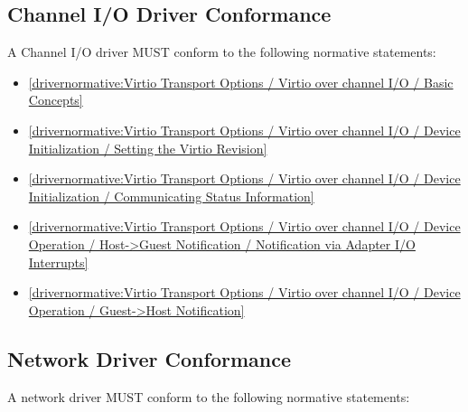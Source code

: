 \subsection{Channel I/O Driver Conformance}\label{sec:Conformance / Driver Conformance / Channel I/O Driver Conformance}

A Channel I/O driver MUST conform to the following normative statements:

\begin{itemize}
\item \ref{drivernormative:Virtio Transport Options / Virtio over channel I/O / Basic Concepts}
\item \ref{drivernormative:Virtio Transport Options / Virtio over channel I/O / Device Initialization / Setting the Virtio Revision}
\item \ref{drivernormative:Virtio Transport Options / Virtio over channel I/O / Device Initialization / Communicating Status Information}
\item \ref{drivernormative:Virtio Transport Options / Virtio over channel I/O / Device Operation / Host->Guest Notification / Notification via Adapter I/O Interrupts}
\item \ref{drivernormative:Virtio Transport Options / Virtio over channel I/O / Device Operation / Guest->Host Notification}
\end{itemize}

\subsection{Network Driver Conformance}\label{sec:Conformance / Driver Conformance / Network Driver Conformance}

A network driver MUST conform to the following normative statements:

